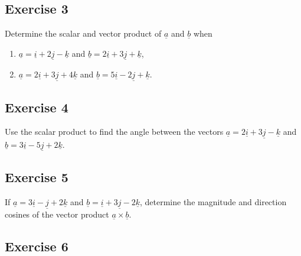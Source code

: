\documentclass[
  11pt,
  oneside]{book}
\providecommand{\tightlist}{%
  \setlength{\itemsep}{0pt}\setlength{\parskip}{0pt}}
\newcommand{\slide}{}
\theoremstyle{definition}
\theoremstyle{definition}
\theoremstyle{definition}
\theoremstyle{definition}
\theoremstyle{remark}
\begin{document}
\slide

\subsection*{Exercise 3}\label{exercise-3-12}

Determine the scalar and vector product of \(\underline{a}\) and \(\underline{b}\) when

\begin{enumerate}
\def\labelenumi{\roman{enumi}.}
\tightlist
\item
  \(\underline{a} = \underline{i} + 2\underline{j} - \underline{k}\) and \(\underline{b} = 2\underline{i} + 3\underline{j} + \underline{k}\),
\item
  \(\underline{a} = 2\underline{i} + 3\underline{j} + 4\underline{k}\) and \(\underline{b} = 5\underline{i} - 2\underline{j} + \underline{k}\).
\end{enumerate}

\slide

\subsection*{Exercise 4}\label{exercise-4-10}

Use the scalar product to find the angle between the vectors \(\underline{a}=2\underline{i} + 3\underline{j} - \underline{k}\) and \(\underline{b}=3\underline{i} - 5\underline{j} + 2\underline{k}\).

\slide

\subsection*{Exercise 5}\label{exercise-5-8}

If \(\underline{a} = 3\underline{i} - \underline{j} + 2\underline{k}\) and \(\underline{b} = \underline{i} + 3\underline{j} - 2\underline{k}\), determine the magnitude and direction cosines of the vector product \(\underline{a} \times \underline{b}\).

\slide

\subsection*{Exercise 6}\label{exercise-6-6}
\end{document}
